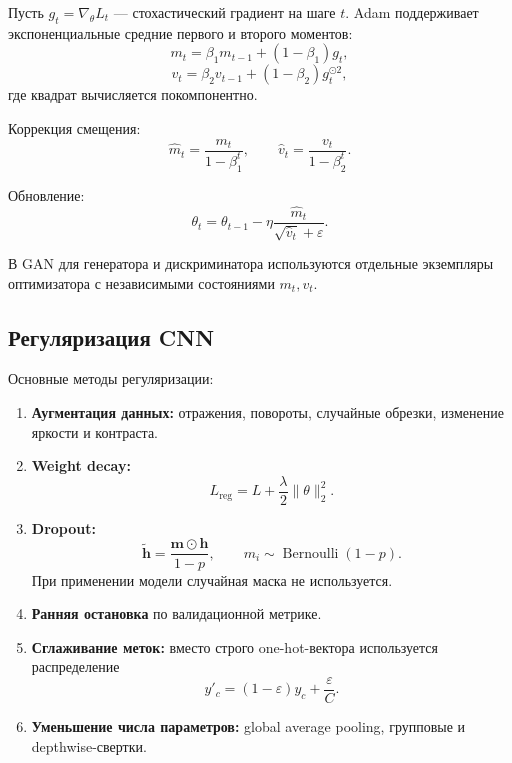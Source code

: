\documentclass[12pt,a4paper]{article}
\numberwithin{equation}{section}
\theoremstyle{definition}
\theoremstyle{remark}
\begin{document}
Пусть \(g_t=\nabla_\theta L_t\) --- стохастический градиент на шаге
\(t\). Adam поддерживает экспоненциальные средние первого и второго
моментов:
\[
    m_t
    =
    \beta_1m_{t-1}
    +(1-\beta_1)g_t,
\]
\[
    v_t
    =
    \beta_2v_{t-1}
    +(1-\beta_2)g_t^{\odot2},
\]
где квадрат вычисляется покомпонентно.

Коррекция смещения:
\[
    \widehat{m}_t
    =
    \frac{m_t}{1-\beta_1^t},
    \qquad
    \widehat{v}_t
    =
    \frac{v_t}{1-\beta_2^t}.
\]

Обновление:
\[
    \theta_t
    =
    \theta_{t-1}
    -
    \eta
    \frac{\widehat{m}_t}
    {\sqrt{\widehat{v}_t}+\varepsilon}.
\]

В GAN для генератора и дискриминатора используются отдельные
экземпляры оптимизатора с независимыми состояниями \(m_t,v_t\).

\subsection{Регуляризация CNN}

Основные методы регуляризации:

\begin{enumerate}
    \item \textbf{Аугментация данных:} отражения, повороты, случайные
    обрезки, изменение яркости и контраста.

    \item \textbf{Weight decay:}
    \[
        L_{\mathrm{reg}}
        =
        L+\frac{\lambda}{2}\|\theta\|_2^2.
    \]

    \item \textbf{Dropout:}
    \[
        \widetilde{\bm{h}}
        =
        \frac{\bm{m}\odot\bm{h}}{1-p},
        \qquad
        m_i\sim\operatorname{Bernoulli}(1-p).
    \]
    При применении модели случайная маска не используется.

    \item \textbf{Ранняя остановка} по валидационной метрике.

    \item \textbf{Сглаживание меток:}
    вместо строго one-hot-вектора используется распределение
    \[
        y'_c
        =
        (1-\varepsilon)y_c+\frac{\varepsilon}{C}.
    \]

    \item \textbf{Уменьшение числа параметров:} global average
    pooling, групповые и depthwise-свертки.
\end{enumerate}
\end{document}
